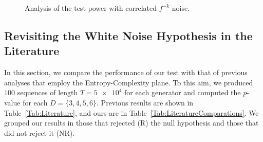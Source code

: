 \documentclass[alpha-refs]{wiley-article}
\begin{document}
\begin{figure}
	\centering
	\caption{Analysis of the test power with correlated $f^{-k}$ noise.}
	\label{fig:correlation}
\end{figure}

\subsection{Revisiting the White Noise Hypothesis in the Literature}

In this section, we compare the performance of our test with that of 
previous analyses that employ the Entropy-Complexity plane.
To this aim, we produced $100$ sequences of length $T = \num[scientific-notation=true]{5 e4}$ for each generator and computed the $p$-value for each $D = \{3, 4, 5, 6\}$.
Previous results are shown in Table~\ref{Tab:Literature}, and ours are in Table~\ref{Tab:LiteratureComparations}.
We grouped our results in those that rejected (R) the null hypothesis and those that did not reject it (NR).
\end{document}
